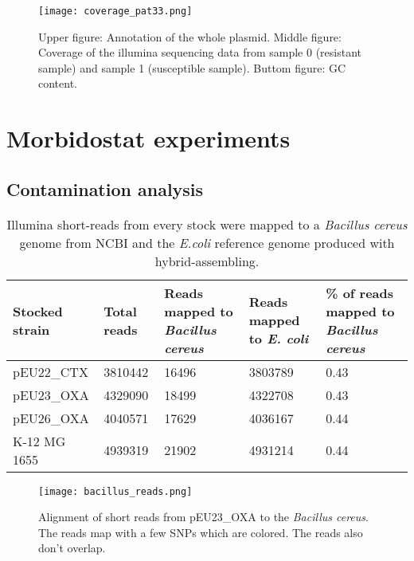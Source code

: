 \begin{figure}[H]
	\texttt{[image: coverage\_pat33.png]}
	\caption{Upper figure: Annotation of the whole plasmid. Middle figure: Coverage of the illumina sequencing data from sample 0 (resistant sample) and sample 1 (susceptible sample). Buttom figure: GC content.}
	\label{figure:coverage}
\end{figure}
\newpage
\newpage
\section{Morbidostat experiments}
\subsection{Contamination analysis}
\begin{table}[H]
	\begin{tabularx}{\linewidth}{|LLLLL|}
		\hline
		Stocked strain    & Total reads & Reads mapped to \textit{Bacillus cereus} & Reads mapped to \textit{E. coli} & \% of reads mapped to \textit{Bacillus cereus} \\ \hline
		pEU22\_CTX & 3810442     & 16496                                                     & 3803789                                           & 0.43                                                            \\ \hline
		pEU23\_OXA & 4329090     & 18499                                                     & 4322708                                           & 0.43                                                            \\ \hline
		pEU26\_OXA & 4040571     & 17629                                                     & 4036167                                           & 0.44                                                            \\ \hline
		K-12 MG 1655      & 4939319     & 21902                                                     & 4931214                                           & 0.44                                                            \\ \hline
	\end{tabularx}
	\caption{Illumina short-reads from every stock were mapped to a \textit{Bacillus cereus} genome from NCBI \cite{noauthor_bacillus_nodate} and the \textit{E.coli} reference genome produced with  hybrid-assembling.}
	\label{table:bacillus_reads}
\end{table}
\begin{figure}
\texttt{[image: bacillus\_reads.png]}
\caption{Alignment of short reads from pEU23\_OXA to the \textit{Bacillus cereus}. The reads map with a few SNPs which are colored. The reads also don't overlap.}
\label{figure:bacillus_reads}
\end{figure}
